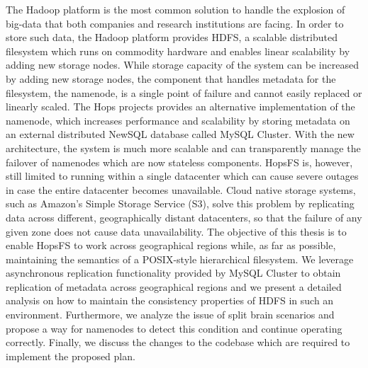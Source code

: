 The Hadoop platform is the most common solution to handle the explosion of big-data that both companies and research institutions are facing.
In order to store such data, the Hadoop platform provides HDFS, a scalable distributed filesystem which runs on commodity hardware and enables linear scalability by adding new storage nodes.
While storage capacity of the system can be increased by adding new storage nodes, the component that handles metadata for the filesystem, the namenode, is a single point of failure and cannot easily replaced or linearly scaled.
The Hops projects provides an alternative implementation of the namenode, which increases performance and scalability by storing metadata on an external distributed NewSQL database called MySQL Cluster.
With the new architecture, the system is much more scalable and can transparently manage the failover of namenodes which are now stateless components.
HopsFS is, however, still limited to running within a single datacenter which can cause severe outages in case the entire datacenter becomes unavailable.
Cloud native storage systems, such as Amazon's Simple Storage Service (S3), solve this problem by replicating data across different, geographically distant datacenters, so that the failure of any given zone does not cause data unavailability.
The objective of this thesis is to enable HopsFS to work across geographical regions while, as far as possible, maintaining the semantics of a POSIX-style hierarchical filesystem.
We leverage asynchronous replication functionality provided by MySQL Cluster to obtain replication of metadata across geographical regions and we present a detailed analysis on how to maintain the consistency properties of HDFS in such an environment.
Furthermore, we analyze the issue of split brain scenarios and propose a way for namenodes to detect this condition and continue operating correctly.
Finally, we discuss the changes to the codebase which are required to implement the proposed plan.
